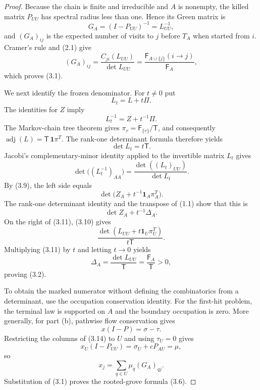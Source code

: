 \documentclass[11pt]{article}
\newcommand{\one}{\mathbf 1}
\newcommand{\cF}{\mathsf F}
\newcommand{\cT}{\mathsf T}
\begin{document}
\begin{proof}
Because the chain is finite and irreducible and $A$ is nonempty, the killed matrix $P_{UU}$ has spectral radius less than one.  Hence its Green matrix is
\[
G_A=(I-P_{UU})^{-1}=L_{UU}^{-1},
\]
and $(G_A)_{ij}$ is the expected number of visits to $j$ before $T_A$ when started from $i$.  Cramer's rule and (2.1) give
\[
(G_A)_{ij}
=\frac{C_{ji}(L_{UU})}{\det L_{UU}}
=\frac{\cF_{A\cup\{j\}}(i\to j)}{\cF_A},
\]
which proves (3.1).

We next identify the frozen denominator.  For $t\ne0$ put
\[
L_t=L+t\Pi.
\]
The identities for $Z$ imply
\begin{equation}
L_t^{-1}=Z+t^{-1}\Pi.
\tag{3.9}
\end{equation}
The Markov-chain tree theorem gives $\pi_r=\cF_{\{r\}}/\cT$, and consequently $\operatorname{adj}(L)=\cT\,\one\pi^T$.  The rank-one determinant formula therefore yields
\begin{equation}
\det L_t=t\cT.
\tag{3.10}
\end{equation}
Jacobi's complementary-minor identity applied to the invertible matrix $L_t$ gives
\begin{equation}
\det\bigl((L_t^{-1})_{AA}\bigr)
=
\frac{\det((L_t)_{UU})}{\det L_t}.
\tag{3.11}
\end{equation}
By (3.9), the left side equals
\[
\det\bigl(Z_A+t^{-1}\one_A\pi_A^T\bigr).
\]
The rank-one determinant identity and the transpose of (1.1) show that this is
\begin{equation}
\det Z_A+t^{-1}\Delta_A.
\tag{3.12}
\end{equation}
On the right of (3.11), (3.10) gives
\begin{equation}
\frac{\det(L_{UU}+t\one_U\pi_U^T)}{t\cT}.
\tag{3.13}
\end{equation}
Multiplying (3.11) by $t$ and letting $t\to0$ yields
\[
\Delta_A=\frac{\det L_{UU}}{\cT}=\frac{\cF_A}{\cT}>0,
\]
proving (3.2).

To obtain the marked numerator without defining the combinatorics from a determinant, use the occupation conservation identity.  For the first-hit problem, the terminal law is supported on $A$ and the boundary occupation is zero.  More generally, for part (b), pathwise flow conservation gives
\begin{equation}
x(I-P)=\sigma-\tau.
\tag{3.14}
\end{equation}
Restricting the columns of (3.14) to $U$ and using $\tau_U=0$ gives
\begin{equation}
x_U(I-P_{UU})=\sigma_U+cP_{AU}=\mu,
\tag{3.15}
\end{equation}
so
\[
x_j=\sum_{q\in U}\mu_q(G_A)_{qj}.
\]
Substitution of (3.1) proves the rooted-grove formula (3.6).


\end{proof}
\end{document}
